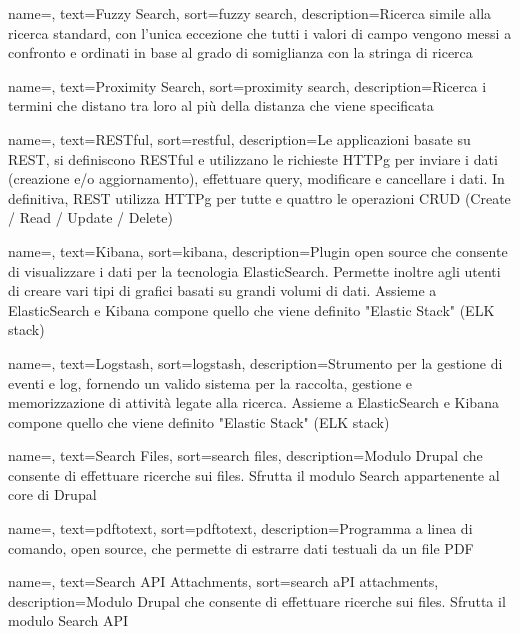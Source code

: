 {
	name=,
	text=Fuzzy Search,
	sort=fuzzy search,
	description={Ricerca simile alla ricerca standard, con l'unica eccezione che tutti i valori di campo vengono messi a confronto e ordinati in base al grado di somiglianza con la stringa di ricerca}
}

{
	name=,
	text=Proximity Search,
	sort=proximity search,
	description={Ricerca i termini che distano tra loro al più della distanza che viene specificata}
}

{
	name=,
	text=RESTful,
	sort=restful,
	description={Le applicazioni basate su \gls{REST}, si definiscono RESTful e utilizzano le richieste \gls{HTTPg} per inviare i dati (creazione e/o aggiornamento), effettuare query, modificare e cancellare i dati. In definitiva, \gls{REST} utilizza \gls{HTTPg} per tutte e quattro le operazioni CRUD (Create / Read / Update / Delete)}
}

{
	name=,
	text=Kibana,
	sort=kibana,
	description={Plugin \gls{open source} che consente di visualizzare i dati per la tecnologia \gls{ElasticSearch}. Permette inoltre agli utenti di creare vari tipi di grafici basati su grandi volumi di dati. Assieme a \gls{ElasticSearch} e \gls{Kibana} compone quello che viene definito "Elastic Stack" (ELK stack)}
}

{
	name=,
	text=Logstash,
	sort=logstash,
	description={Strumento per la gestione di eventi e log, fornendo un valido sistema per la raccolta, gestione e memorizzazione di attività legate alla ricerca. Assieme a \gls{ElasticSearch} e \gls{Kibana} compone quello che viene definito "Elastic Stack" (ELK stack)}
}

{
	name=,
	text=Search Files,
	sort=search files,
	description={\gls{Modulo} \gls{Drupal} che consente di effettuare ricerche sui files. Sfrutta il modulo Search appartenente al core di \gls{Drupal}}
}

{
	name=,
	text=pdftotext,
	sort=pdftotext,
	description={Programma a linea di comando, 	\gls{open source}, che permette di estrarre dati testuali da un file PDF}
}

{
	name=,
	text=Search API Attachments,
	sort=search aPI attachments,
	description={\gls{Modulo} \gls{Drupal} che consente di effettuare ricerche sui files. Sfrutta il modulo \gls{Search API}}
}

